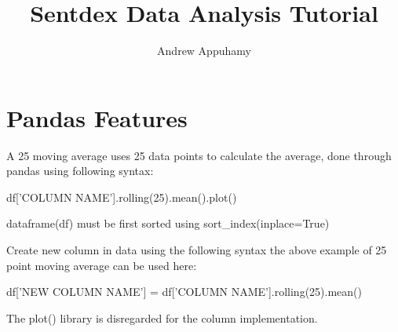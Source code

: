 \documentclass{article}
\title{Sentdex Data Analysis Tutorial }
\author{Andrew Appuhamy}
\date{}
\begin{document}
\maketitle

\section{Pandas Features}
\setlength{\parskip}{1em}
A 25 moving average uses 25 data points to calculate the average, done through pandas using following syntax:

df['COLUMN NAME'].rolling(25).mean().plot() 

dataframe(df) must be first sorted using sort\_index(inplace=True)

\par
Create new column in data using the following syntax the above example of 25 point moving average can be used here:

df['NEW COLUMN NAME'] = df['COLUMN NAME'].rolling(25).mean()

The plot() library is disregarded for the column implementation. 
\end{document}
